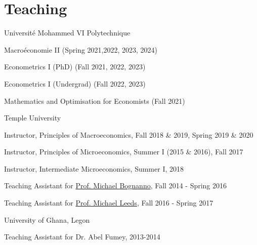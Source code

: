 \documentclass[12pt,letterpaper]{article}
\renewenvironment{itemize}{
  \begin{list}{}{
    \setlength{\leftmargin}{1.5em}
  }
}{
  \end{list}
}
\begin{document}
\section*{Teaching}
\begin{enumerate}
	\item Universit\'e Mohammed VI Polytechnique
	\begin{itemize}
		\item Macro\'economie II (Spring 2021,2022, 2023, 2024)
		\item Econometrics I (PhD) (Fall 2021, 2022, 2023)
		\item Econometrics I (Undergrad) (Fall 2022, 2023)
		\item Mathematics and Optimisation for Economists (Fall 2021)
	\end{itemize}
	\item Temple University
	\begin{itemize}
		\item Instructor, Principles of Macroeconomics, Fall 2018 \& 2019, Spring 2019 \& 2020
		\item Instructor, Principles of Microeconomics, Summer I (2015 \& 2016), Fall 2017
		\item Instructor, Intermediate Microeconomics, Summer I, 2018
		\item Teaching Assistant for \href{https://liberalarts.temple.edu/academics/faculty/bognanno-michael}{Prof. Michael Bognanno}, Fall 2014 - Spring 2016
		\item Teaching Assistant for \href{https://liberalarts.temple.edu/academics/faculty/leeds-michael}{Prof. Michael Leeds}, Fall 2016 - Spring 2017
	\end{itemize}
	\item University of Ghana, Legon
	\begin{itemize}
		\item Teaching Assistant for Dr. Abel Fumey, 2013-2014
	\end{itemize}
\end{enumerate}
\end{document}
